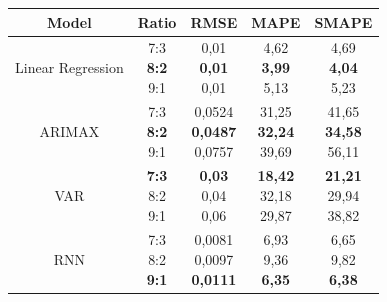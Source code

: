 \documentclass{ieeeojies}
\begin{document}
\begin{table}[H]
    \begin{tabular*}{\linewidth}{@{\extracolsep{\fill}}|c|c|c|c|c|}
        \hline
        \textbf{Model} & \textbf{Ratio} & \textbf{RMSE} & \textbf{MAPE} & \textbf{SMAPE} \\
        \hline
        Linear Regression & \makecell{7:3 \\ \textbf{8:2} \\ 9:1} & \makecell{0,01 \\ \textbf{0,01} \\ 0,01} & \makecell{4,62 \\ \textbf{3,99} \\ 5,13} & \makecell{4,69 \\ \textbf{4,04} \\ 5,23} \\
        \hline
        ARIMAX & \makecell{7:3 \\ \textbf{8:2} \\ 9:1} & \makecell{0,0524 \\ \textbf{0,0487} \\ 0,0757} & \makecell{31,25 \\ \textbf{32,24} \\ 39,69} & \makecell{41,65 \\ \textbf{34,58} \\ 56,11} \\
        \hline
        VAR & \makecell{\textbf{7:3} \\ 8:2 \\ 9:1} & \makecell{\textbf{0,03} \\ 0,04 \\ 0,06} & \makecell{\textbf{18,42} \\ 32,18 \\ 29,87} & \makecell{\textbf{21,21} \\ 29,94 \\ 38,82} \\
        \hline
        RNN & \makecell{7:3 \\ 8:2 \\ \textbf{9:1}} & \makecell{0,0081 \\ 0,0097 \\ \textbf{0,0111}} & \makecell{6,93 \\ 9,36 \\ \textbf{6,35}} & \makecell{6,65 \\ 9,82 \\ \textbf{6,38}} \\

\end{tabular*}
\end{table}
\end{document}
